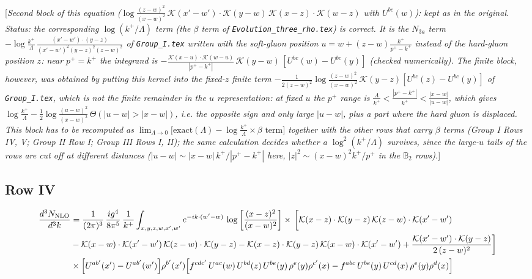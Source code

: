 \documentclass[9pt]{article}
\def\mf#1{\mathbb{#1}}
\newcommand{\rnote}[1]{{\color{teal}[\textit{#1}]}}
\numberwithin{equation}{section}
\begin{document}
\rnote{Second block of this equation ($\log\frac{(z-w)^{2}}{(x-w)^{2}}\,\mathcal{K}(x'-w')\cdot\mathcal{K}(y-w)\,\mathcal{K}(x-z)\cdot\mathcal{K}(w-z)$ with $U^{bc}(w)$): kept as in the original. Status: the corresponding $\log(k^{+}/\Lambda)$ term (the $\beta$ term of \texttt{Evolution\_three\_rho.tex}) is correct. It is the $N_{3a}$ term $-\log\frac{k^{+}}{\Lambda}\,\frac{(x'-w')\cdot(y-z)}{(x'-w')^{2}(y-z)^{2}(z-w)^{2}}$ of \texttt{Group\_I.tex} written with the soft-gluon position $u=w+(z-w)\frac{k^{+}}{p^{+}-k^{+}}$ instead of the hard-gluon position $z$: near $p^{+}=k^{+}$ the integrand is $-\frac{\mathcal{K}(x-u)\cdot\mathcal{K}(w-u)}{|p^{+}-k^{+}|}\,\mathcal{K}(y-w)\,[U^{bc}(w)-U^{bc}(y)]$ (checked numerically). The finite block, however, was obtained by putting this kernel into the fixed-$z$ finite term $-\frac{1}{2(z-w)^{2}}\log\frac{(z-w)^{2}}{(x-w)^{2}}\,\mathcal{K}(y-z)[U^{bc}(z)-U^{bc}(y)]$ of \texttt{Group\_I.tex}, which is not the finite remainder in the $u$ representation: at fixed $u$ the $p^{+}$ range is $\frac{\Lambda}{k^{+}}<\frac{|p^{+}-k^{+}|}{k^{+}}<\frac{|x-w|}{|u-w|}$, which gives $\log\frac{k^{+}}{\Lambda}-\frac12\log\frac{(u-w)^{2}}{(x-w)^{2}}\,\Theta(|u-w|>|x-w|)$, i.e. the opposite sign and only large $|u-w|$, plus a part where the hard gluon is displaced. This block has to be recomputed as $\lim_{\Lambda\to0}\big[\text{exact}(\Lambda)-\log\frac{k^{+}}{\Lambda}\times\beta\text{ term}\big]$ together with the other rows that carry $\beta$ terms (Group I Rows IV, V; Group II Row I; Group III Rows I, II); the same calculation decides whether a $\log^{2}(k^{+}/\Lambda)$ survives, since the large-$u$ tails of the rows are cut off at different distances ($|u-w|\sim|x-w|\,k^{+}/|p^{+}-k^{+}|$ here, $|z|^{2}\sim(x-w)^{2}k^{+}/p^{+}$ in the $\mf{B}_{2}$ rows).}

\subsection{Row IV}
\begin{align}
\frac{d^{3}N_{\rm NLO}}{d^{3}k} & = \frac{1}{(2\pi)^{3}}\,\frac{ig^{4}}{8\pi^{5}}\,\frac{1}{k^{+}}\int_{x,y,z,w,x',w'}e^{-ik\cdot(w'-w)}\,\log\left[\frac{(x-z)^{2}}{(x-w)^{2}}\right]\times\,\bigg[\mathcal{K}(x-z)\cdot\mathcal{K}(y-z)\,\mathcal{K}(z-w)\cdot\mathcal{K}(x'-w')\notag \\ & -\mathcal{K}(x-w)\cdot\mathcal{K}(x'-w')\,\mathcal{K}(z-w)\cdot\mathcal{K}(y-z)-\mathcal{K}(x-z)\cdot\mathcal{K}(y-z)\,\mathcal{K}(x-w)\cdot\mathcal{K}(x'-w')+\frac{\mathcal{K}(x'-w')\cdot\mathcal{K}(y-z)}{2\,(z-w)^{2}}\bigg]\notag \\ & \times\Big[U^{ab'}(x')-U^{ab'}(w')\Big]\rho^{b'}(x')\Big[f^{cdc'}\,U^{ac}(w)\,U^{bd}(z)\,U^{be}(y)\,\rho^{e}(y)\rho^{c'}(x)-f^{abc}\,U^{be}(y)\,U^{cd}(x)\,\rho^{e}(y)\rho^{d}(x)\Big]
\end{align}
\end{document}
